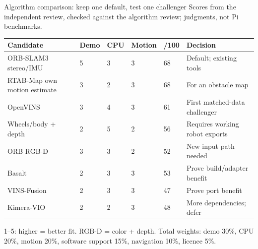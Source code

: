 \begin{frame}{Algorithm comparison: keep one default, test one challenger}
\small Scores from the independent review, checked against the algorithm review; judgments, not Pi benchmarks.\par\smallskip\small\linespread{1.03}\selectfont\renewcommand{\arraystretch}{1.05}
\begin{tabular}{@{}L{58mm}L{13mm}L{12mm}L{17mm}L{13mm}L{61mm}@{}}\toprule
\textbf{Candidate} & \textbf{Demo} & \textbf{CPU} & \textbf{Motion} & \textbf{/100} & \textbf{Decision}\\\midrule
ORB-SLAM3 stereo/IMU & 5 & 3 & 3 & 68 & Default; existing tools\\
RTAB-Map own motion estimate & 3 & 2 & 3 & 68 & For an obstacle map\\
OpenVINS & 3 & 4 & 3 & 61 & First matched-data challenger\\
Wheels/body + depth & 2 & 5 & 2 & 56 & Requires working robot exports\\
ORB RGB-D & 3 & 3 & 2 & 52 & New input path needed\\
Basalt & 2 & 3 & 3 & 53 & Prove build/adapter benefit\\
VINS-Fusion & 2 & 3 & 3 & 47 & Prove port benefit\\
Kimera-VIO & 2 & 2 & 3 & 48 & More dependencies; defer\\\bottomrule\end{tabular}\par\smallskip\small 1--5: higher = better fit. RGB-D = color + depth. Total weights: demo 30\%, CPU 20\%, motion 20\%, software support 15\%, navigation 10\%, licence 5\%.
\end{frame}

